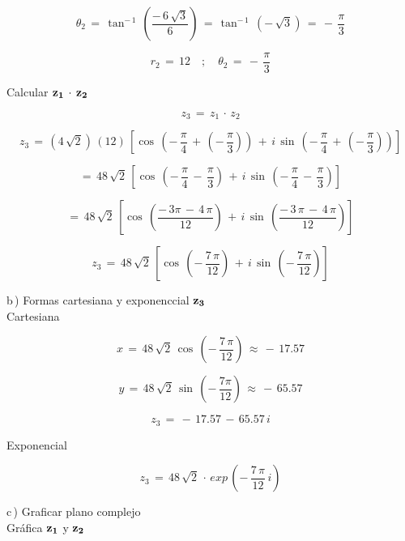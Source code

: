 \documentclass[a4paper,11pt,openany]{book}
\begin{document}
$$\theta_{2}\,=\,\tan^{-\,1}\,\left(\dfrac{-\,6\,\sqrt{3}}{6}\right)\,=\,\tan^{-\,1}\,(-\,\sqrt{3})\,=\,-\,\dfrac{\pi}{3}$$

$$\boxed{r_{2}\,=\,12 \quad;\quad \theta_{2}\,=\,-\,\dfrac{\pi}{3}}$$

\textcolor{ao(english)}{} Calcular $\bf{z_{1}\,\cdot\,z_{2}}$

$$z_{3}\,=\,z_{1}\,\cdot\,z_{2}$$

$$z_{3}\,=\,\left(4\,\sqrt{2}\right)\,(12)\,\left[\cos\,\left(-\,\dfrac{\pi}{4}\,+\,\left(-\,\dfrac{\pi}{3}\right)\right)\,+\,i\,\sin\,\left(-\,\dfrac{\pi}{4}\,+\,\left(-\,\dfrac{\pi}{3}\right)\right)\right]$$

$$=\,48\,\sqrt{2}\,\left[\cos\,\left(-\,\dfrac{\pi}{4}\,-\,\dfrac{\pi}{3}\right)\,+\,i\,\sin\,\left(-\,\dfrac{\pi}{4}\,-\,\dfrac{\pi}{3}\right)\right]$$

$$=\,48\,\sqrt{2}\,\left[\cos\,\left(\dfrac{-\,3\pi\,-\,4\,\pi}{12}\right)\,+\,i\,\sin\,\left(\dfrac{-\,3\,\pi\,-\,4\,\pi}{12}\right)\right]$$

$$z_{3}\,=\,48\,\sqrt{2}\,\left[\cos\,\left(-\,\dfrac{7\,\pi}{12}\right)\,+\,i\,\sin\,\left(-\,\dfrac{7\,\pi}{12}\right)\right]$$

\textcolor{ao(english)}{b\,)} Formas cartesiana y exponenccial $\bf{z_{3}}$\\

\textcolor{ao(english)}{} Cartesiana

$$x\,=\,48\,\sqrt{2}\,\cos\,\left(-\,\dfrac{7\,\pi}{12}\right)\,\approx\,-\,17.57$$

$$y\,=\,48\,\sqrt{2}\,\sin\,\left(-\,\dfrac{7\pi}{12}\right)\,\approx\,-\,65.57$$

$$z_{3}\,=\,-\,17.57\,-\,65.57\,i$$

\textcolor{ao(english)}{} Exponencial

$$z_{3}\,=\,48\,\sqrt{2}\,\cdot\,exp\,\left(-\,\dfrac{7\,\pi}{12}\,i\right)$$

\textcolor{ao(english)}{c\,)} Graficar plano complejo\\

\textcolor{ao(english)}{} Gráfica $\bf{z_{1}}$ y $\bf{z_{2}}$
\end{document}
